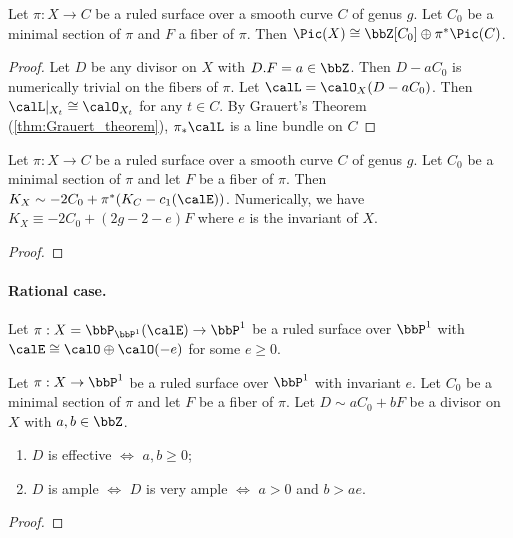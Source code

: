     \begin{proposition}\label{prop:Picard_group_of_ruled_surface}
        Let \(\pi:X \to C\) be a ruled surface over a smooth curve \(C\) of genus \(g\). 
        Let \(C_0\) be a minimal section of \(\pi\) and \(F\) a fiber of \(\pi\). 
        Then \(\Pic(X) \cong \bbZ [C_0] \oplus \pi^*\Pic(C)\).
    \end{proposition}
    \begin{proof}
        Let \(D\) be any divisor on \(X\) with \(D.F = a \in \bbZ\).
        Then \(D - aC_0\) is numerically trivial on the fibers of \(\pi\).
        Let \(\calL = \calO_X(D - aC_0)\).
        Then \(\calL|_{X_t} \cong \calO_{X_t}\) for any \(t \in C\).
        By Grauert's Theorem (\cref{thm:Grauert_theorem}), \(\pi_*\calL\) is a line bundle on \(C\) 
    \end{proof}

    \begin{proposition}\label{prop:canonical_divisor_of_ruled_surface}
        Let \(\pi:X \to C\) be a ruled surface over a smooth curve \(C\) of genus \(g\). 
        Let \(C_0\) be a minimal section of \(\pi\) and let \(F\) be a fiber of \(\pi\). 
        Then \(K_X \sim -2C_0 + \pi^*(K_C-c_1(\calE))\).
        Numerically, we have \(K_X \equiv -2C_0 + (2g-2-e)F\) where \(e\) is the invariant of \(X\).
    \end{proposition}
    \begin{proof}
    \end{proof}

    \paragraph{Rational case.} Let \(\pi:X = \bbP_{\bbP^1}(\calE) \to \bbP^1\) be a ruled surface over \(\bbP^1\) with \(\calE \cong \calO \oplus \calO(-e)\) for some \(e \geq 0\).

    \begin{theorem}\label{thm:positivity_of_divisors_on_rational_ruled_surface}
        Let \(\pi:X \to \bbP^1\) be a ruled surface over \(\bbP^1\) with invariant \(e\).
        Let \(C_0\) be a minimal section of \(\pi\) and let \(F\) be a fiber of \(\pi\). 
        Let \(D \sim aC_0 + bF\) be a divisor on \(X\) with \(a,b \in \bbZ\).
        \begin{enumerate}
            \item \(D\) is effective \(\iff\) \(a,b \geq 0\);
            \item \(D\) is ample \(\iff\) \(D\) is very ample \(\iff\) \(a > 0\) and \(b > ae\).
        \end{enumerate} 
    \end{theorem}
    \begin{proof}
    \end{proof}

